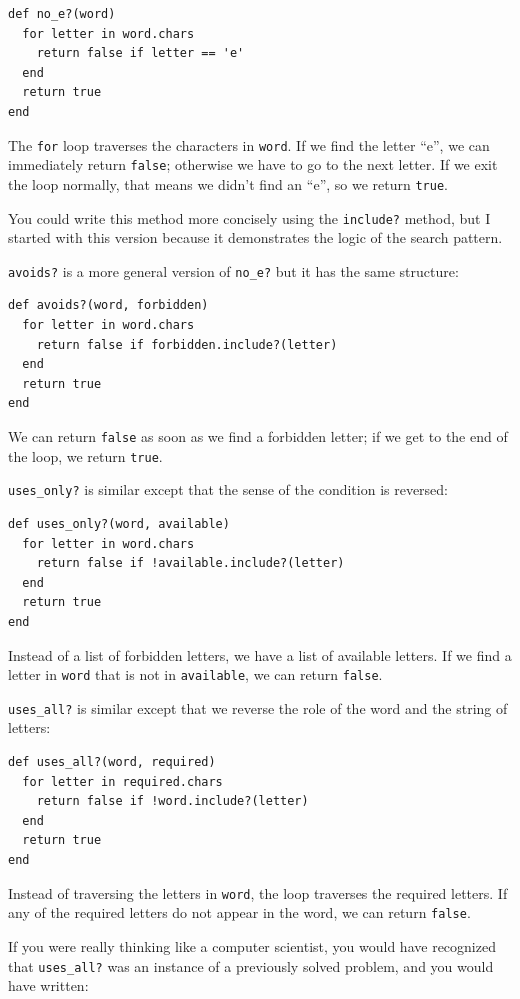 \documentclass[10pt]{book}
\begin{document}
\begin{verbatim}
def no_e?(word)
  for letter in word.chars
    return false if letter == 'e'
  end
  return true
end
\end{verbatim}
%
The {\tt for} loop traverses the characters in {\tt word}.  If we find
the letter ``e'', we can immediately return {\tt false}; otherwise we
have to go to the next letter.  If we exit the loop normally, that
means we didn't find an ``e'', so we return {\tt true}.

You could write this method more concisely using the {\tt include?}
method, but I started with this version because it 
demonstrates the logic of the search pattern.

{\tt avoids?} is a more general version of \verb"no_e?" but it
has the same structure:

\begin{verbatim}
def avoids?(word, forbidden)
  for letter in word.chars
    return false if forbidden.include?(letter)
  end
  return true
end
\end{verbatim}
%
We can return {\tt false} as soon as we find a forbidden letter;
if we get to the end of the loop, we return {\tt true}.

\verb"uses_only?" is similar except that the sense of the condition
is reversed:

\begin{verbatim}
def uses_only?(word, available)
  for letter in word.chars
    return false if !available.include?(letter)
  end
  return true
end
\end{verbatim}
%
Instead of a list of forbidden letters, we have a list of available
letters.  If we find a letter in {\tt word} that is not in
{\tt available}, we can return {\tt false}.

\verb"uses_all?" is similar except that we reverse the role
of the word and the string of letters:

\begin{verbatim}
def uses_all?(word, required)
  for letter in required.chars
    return false if !word.include?(letter)
  end
  return true
end
\end{verbatim}
%
Instead of traversing the letters in {\tt word}, the loop
traverses the required letters.  If any of the required letters
do not appear in the word, we can return {\tt false}.

If you were really thinking like a computer scientist, you would
have recognized that \verb"uses_all?" was an instance of a
previously solved problem, and you would have written:
\end{document}
